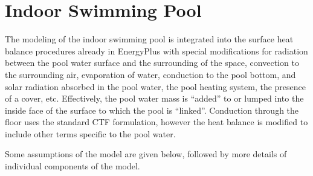 \section{Indoor Swimming Pool }\label{indoor-swimming-pool}

The modeling of the indoor swimming pool is integrated into the surface heat balance procedures already in EnergyPlus with special modifications for radiation between the pool water surface and the surrounding of the space, convection to the surrounding air, evaporation of water, conduction to the pool bottom, and solar radiation absorbed in the pool water, the pool heating system, the presence of a cover, etc. Effectively, the pool water mass is ``added'' to or lumped into the inside face of the surface to which the pool is ``linked''. Conduction through the floor uses the standard CTF formulation, however the heat balance is modified to include other terms specific to the pool water.

Some assumptions of the model are given below, followed by more details of individual components of the model.

